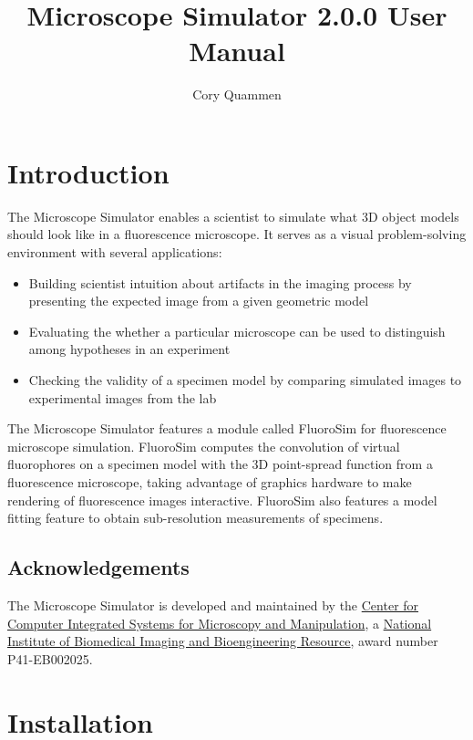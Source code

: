 \documentclass[11pt]{article}
\title{Microscope Simulator 2.0.0 User Manual}
\author{Cory Quammen}
\begin{document}
\maketitle

\section{Introduction}

The Microscope Simulator enables a scientist to simulate what 3D object models should look like in a fluorescence microscope. It serves as a visual problem-solving environment with several applications:

\begin{itemize}

\item Building scientist intuition about artifacts in the imaging process by presenting the expected image from a given geometric model

\item Evaluating the whether a particular microscope can be used to distinguish among hypotheses in an experiment

\item Checking the validity of a specimen model by comparing simulated images to experimental images from the lab

\end{itemize}

The Microscope Simulator features a module called FluoroSim for fluorescence microscope simulation. FluoroSim computes the convolution of virtual fluorophores on a specimen model with the 3D point-spread function from a fluorescence microscope, taking advantage of graphics hardware to make rendering of fluorescence images interactive. FluoroSim also features a model fitting feature to obtain sub-resolution measurements of specimens.

\subsection{Acknowledgements}

The Microscope Simulator is developed and maintained by the \href{http://www.cismm.org}{Center for Computer Integrated Systems for Microscopy and Manipulation}, a \href{http://www.nibib.nih.gov/}{National Institute of Biomedical Imaging and Bioengineering Resource}, award number P41-EB002025.

\section{Installation}
\end{document}

